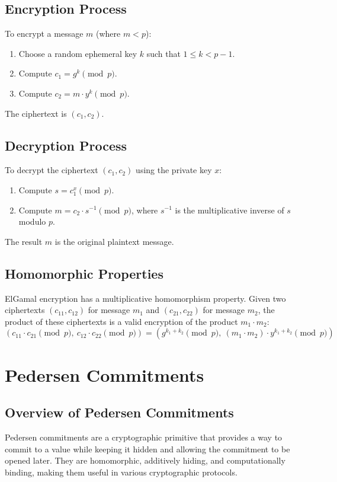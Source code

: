 \documentclass[12pt,a4paper]{report}
\begin{document}
\subsection{Encryption Process}
To encrypt a message \( m \) (where \( m < p \)):
\begin{enumerate}
    \item Choose a random ephemeral key \( k \) such that \( 1 \leq k < p-1 \).
    \item Compute \( c_1 = g^k \pmod p \).
    \item Compute \( c_2 = m \cdot y^k \pmod p \).
\end{enumerate}
The ciphertext is \( (c_1, c_2) \).

\subsection{Decryption Process}
To decrypt the ciphertext \( (c_1, c_2) \) using the private key \( x \):
\begin{enumerate}
    \item Compute \( s = c_1^x \pmod p \).
    \item Compute \( m = c_2 \cdot s^{-1} \pmod p \), where \( s^{-1} \) is the multiplicative inverse of \( s \) modulo \( p \).
\end{enumerate}
The result \( m \) is the original plaintext message.

\subsection{Homomorphic Properties}
ElGamal encryption has a multiplicative homomorphism property. Given two ciphertexts \( (c_{11}, c_{12}) \) for message \( m_1 \) and \( (c_{21}, c_{22}) \) for message \( m_2 \), the product of these ciphertexts is a valid encryption of the product \( m_1 \cdot m_2 \):
\[
(c_{11} \cdot c_{21} \pmod p, \ c_{12} \cdot c_{22} \pmod p) = \left( g^{k_1 + k_2} \pmod p, \ (m_1 \cdot m_2) \cdot y^{k_1 + k_2} \pmod p \right)
\]

\section{Pedersen Commitments}

\subsection{Overview of Pedersen Commitments}
Pedersen commitments are a cryptographic primitive that provides a way to commit to a value while keeping it hidden and allowing the commitment to be opened later. They are homomorphic, additively hiding, and computationally binding, making them useful in various cryptographic protocols.
\end{document}
